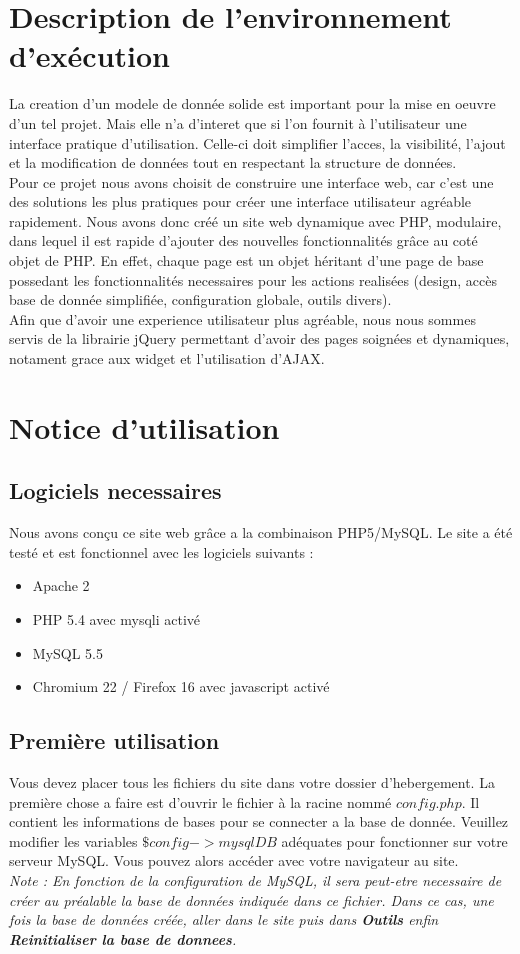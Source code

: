 \documentclass[a4paper, 11pt]{article}
\begin{document}
\section{Description de l'environnement d'exécution}
La creation d'un modele de donnée solide est important pour la mise en oeuvre d'un tel projet. Mais elle n'a d'interet que si l'on fournit à l'utilisateur une interface pratique d'utilisation. Celle-ci doit simplifier l'acces, la visibilité, l'ajout et la modification de données tout en respectant la structure de données.
\\Pour ce projet nous avons choisit de construire une interface web, car c'est une des solutions les plus pratiques pour créer une interface utilisateur agréable rapidement. Nous avons donc créé un site web dynamique avec PHP, modulaire, dans lequel il est rapide d'ajouter des nouvelles fonctionnalités grâce au coté objet de PHP. En effet, chaque page est un objet héritant d'une page de base possedant les fonctionnalités necessaires pour les actions realisées (design, accès base de donnée simplifiée, configuration globale, outils divers). 
\\Afin que d'avoir une experience utilisateur plus agréable, nous nous sommes servis de la librairie jQuery permettant d'avoir des pages soignées et dynamiques, notament grace aux widget et l'utilisation d'AJAX. 
\section{Notice d'utilisation}
\subsection{Logiciels necessaires}
Nous avons conçu ce site web grâce a la combinaison PHP5/MySQL.
Le site a été testé et est fonctionnel avec les logiciels suivants :
\begin{itemize}
\item Apache 2
\item PHP 5.4 avec mysqli activé
\item MySQL 5.5
\item Chromium 22 / Firefox 16 avec javascript activé
\end{itemize}
\subsection{Première utilisation}
Vous devez placer tous les fichiers du site dans votre dossier d'hebergement. La première chose a faire est d'ouvrir le fichier à la racine nommé $config.php$. Il contient les informations de bases pour se connecter a la base de donnée. Veuillez modifier les variables $\$config->mysqlDB$ adéquates pour fonctionner sur votre serveur MySQL. 
Vous pouvez alors accéder avec votre navigateur au site.
\\ \textit{Note : 
En fonction de la configuration de MySQL, il sera peut-etre necessaire de créer au préalable la base de données indiquée dans ce fichier. Dans ce cas, une fois la base de données créée, aller dans le site puis dans \textbf{Outils} enfin \textbf{Reinitialiser la base de donnees}.}
\end{document}
